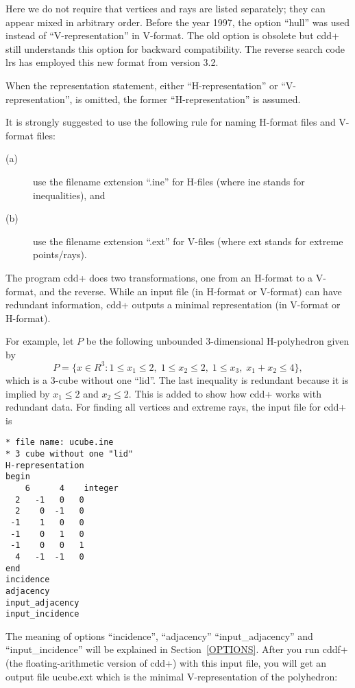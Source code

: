 \documentclass[11pt]{article}
\begin{document}
\bigskip
\noindent
Here we do not require that
vertices and rays are listed
separately; they can appear mixed in arbitrary
order.   Before the year 1997, 
the option ``hull'' was used instead of ``V-representation''
in V-format.  The old option is obsolete but cdd+ still
understands this option for backward compatibility.
The reverse search code lrs has employed this new format
from version 3.2.

When the representation statement, either ``H-representation''
or ``V-representation'', is omitted, the former
``H-representation'' is assumed.


It is strongly suggested to use the following rule for naming
H-format files and V-format files:   
\begin{description}
\item[(a)] use the filename  extension ``.ine'' for H-files (where ine stands for inequalities), and 
\item[(b)]  use the filename  extension ``.ext'' for V-files (where ext stands for extreme points/rays). 
\end{description}

The program cdd+ does two transformations, one from an H-format
to a V-format, and the reverse.    While an input file (in H-format or V-format)
can have redundant information, cdd+ outputs a minimal representation
(in V-format or H-format).

For example, let $P$ be the following unbounded 3-dimensional 
H-polyhedron given by
\[
   P = \{ x  \in R^3:
    1\le x_1 \le 2, \; 1 \le x_2 \le 2, \; 1 \le x_3,  \; x_1 + x_2 \le 4 \},
\]
which is a 3-cube without one ``lid''.   The last inequality is redundant
because it is implied by $x_1 \le 2$ and $x_2 \le 2$.  This is added
to show how cdd+ works with redundant data.
For finding all
vertices and extreme rays, the input file for cdd+ is

\begin{verbatim}
* file name: ucube.ine
* 3 cube without one "lid"
H-representation
begin
    6      4    integer
  2   -1   0   0
  2    0  -1   0
 -1    1   0   0
 -1    0   1   0
 -1    0   0   1
  4   -1  -1   0
end
incidence
adjacency
input_adjacency
input_incidence
\end{verbatim}

The meaning of options ``incidence'', ``adjacency''
``input\_adjacency'' and ``input\_incidence'' 
will be explained in Section~\ref{OPTIONS}.
After you run cddf+ (the floating-arithmetic version of cdd+) 
with this input file, you will get
an output file ucube.ext  which is the minimal V-representation
of the polyhedron:
\end{document}
